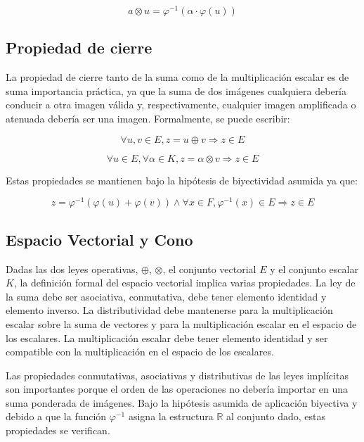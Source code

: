 \begin{equation}	
	a \otimes u = \varphi^{-1}(\alpha\cdot\varphi(u))
\end{equation} 

\subsection{Propiedad de cierre}

La propiedad de cierre tanto de la suma como de la multiplicación escalar es de suma importancia práctica, ya que la suma de dos imágenes cualquiera debería conducir a otra imagen válida y, respectivamente, cualquier imagen amplificada o atenuada debería ser una imagen. Formalmente, se puede escribir:

\begin{equation}
	\forall u,v \in E, z = u \oplus v \Rightarrow z \in E
\end{equation}

\begin{equation}
	\forall u \in E, \forall \alpha \in K, z=\alpha \otimes v \Rightarrow z \in E
\end{equation}

Estas propiedades se mantienen bajo la hipótesis de biyectividad asumida ya que: 

\begin{equation}
	z=\varphi^{-1}(\varphi(u)+\varphi(v)) \land \forall x \in F, \varphi^{-1}(x) \in E \Rightarrow z \in E
\end{equation}

\subsection{Espacio Vectorial y Cono}
Dadas las dos leyes operativas, $\oplus$, $\otimes$, el conjunto vectorial $E$ y el conjunto escalar $K$, la definición formal del espacio vectorial implica varias propiedades. La ley de la suma debe ser asociativa, conmutativa, debe tener elemento identidad y elemento inverso. La distributividad debe mantenerse para la multiplicación escalar sobre la suma de vectores y para la multiplicación escalar en el espacio de los escalares. La multiplicación escalar debe tener elemento identidad y ser compatible con la multiplicación en el espacio de los escalares.

Las propiedades conmutativas, asociativas y distributivas de las leyes implícitas son importantes porque el orden de las operaciones no debería importar en una suma ponderada de imágenes. Bajo la hipótesis asumida de aplicación biyectiva y debido a que la función $\varphi^{-1}$ asigna la estructura $\mathbb{R}$ al conjunto dado, estas propiedades se verifican.

